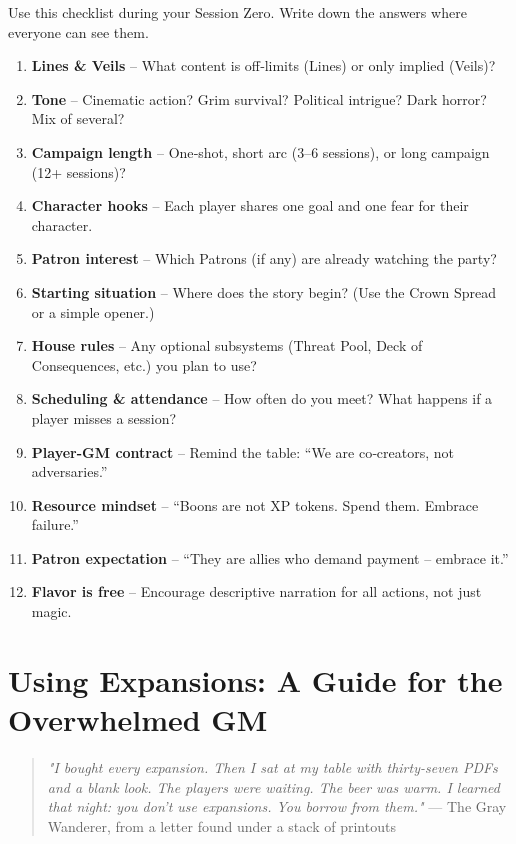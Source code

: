 \begin{tcolorbox}[colback=green!5!white, colframe=green!75!black, title=Session Zero Checklist, fonttitle=\bfseries]
Use this checklist during your Session Zero. Write down the answers where everyone can see them.
\begin{enumerate}
  \item \textbf{Lines \& Veils} – What content is off‑limits (Lines) or only implied (Veils)?
  \item \textbf{Tone} – Cinematic action? Grim survival? Political intrigue? Dark horror? Mix of several?
  \item \textbf{Campaign length} – One‑shot, short arc (3–6 sessions), or long campaign (12+ sessions)?
  \item \textbf{Character hooks} – Each player shares one goal and one fear for their character.
  \item \textbf{Patron interest} – Which Patrons (if any) are already watching the party?
  \item \textbf{Starting situation} – Where does the story begin? (Use the Crown Spread or a simple opener.)
  \item \textbf{House rules} – Any optional subsystems (Threat Pool, Deck of Consequences, etc.) you plan to use?
  \item \textbf{Scheduling \& attendance} – How often do you meet? What happens if a player misses a session?
  \item \textbf{Player-GM contract} – Remind the table: “We are co‑creators, not adversaries.”
  \item \textbf{Resource mindset} – “Boons are not XP tokens. Spend them. Embrace failure.”
  \item \textbf{Patron expectation} – “They are allies who demand payment – embrace it.”
  \item \textbf{Flavor is free} – Encourage descriptive narration for all actions, not just magic.
\end{enumerate}
\end{tcolorbox}

\chapter{Using Expansions: A Guide for the Overwhelmed GM}

\begin{quote}
\small
\textit{"I bought every expansion. Then I sat at my table with thirty-seven PDFs and a blank look. The players were waiting. The beer was warm. I learned that night: you don't use expansions. You borrow from them."}
--- The Gray Wanderer, from a letter found under a stack of printouts
\end{quote}

